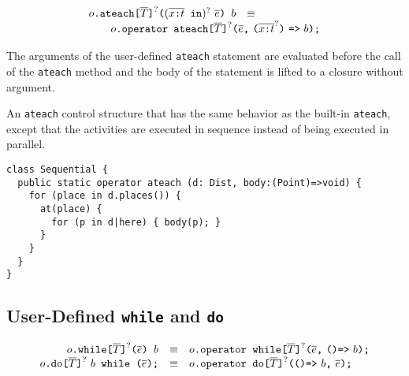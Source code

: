 $$
\begin{array}{rcl}
  \usrAteach{o}{\overline{T}}{\overline{\vardecl{x}{t}}}{\overline{e}}{b}
  & \equiv &
  \\
  \multicolumn{3}{r}{
  \qquad  \libAteach{o}{\overline{T}}{\overline{\vardecl{x}{t}}}{\overline{e}}{b}
  }
\end{array}
$$

The arguments of the user-defined \verb+ateach+ statement are
evaluated before the call of the \verb+ateach+ method and the body of
the statement is lifted to a closure without argument.

\begin{example}
  An \verb+ateach+ control structure that has the same behavior as the
  built-in \verb+ateach+, except that the activities are executed in
  sequence instead of being executed in parallel.

\begin{verbatim}
class Sequential {
  public static operator ateach (d: Dist, body:(Point)=>void) {
    for (place in d.places()) {
      at(place) {
        for (p in d|here) { body(p); }
      }
    }
  }
}
\end{verbatim}
\end{example}

\subsection{User-Defined \texttt{while} and \texttt{do}}


$$
\begin{array}{rcl}
  \usrWhile{o}{\overline{T}}{\overline{e}}{b}
  & \equiv &
  \libWhile{o}{\overline{T}}{\overline{e}}{b}
  \\

  \usrDo{o}{\overline{T}}{b}{\overline{e}}
  & \equiv &
  \libDo{o}{\overline{T}}{b}{\overline{e}}
\end{array}
$$

